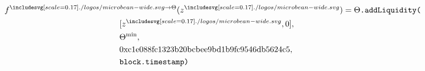 \documentclass[class=article, crop=false]{standalone}
\begin{document}
\begin{enumerate}
        \begin{multline*}
            \begin{aligned}
            & f^{\bean \rightarrow \Theta}(z^{\bean}) = \Theta \code{.addLiquidity(} \\
            & \hspace{4.9cm} [z^{\bean}, 0],\ \\
            & \hspace{4.9cm} \Theta^{\text{min}},\ \\
            & \hspace{4.9cm} \text{0xc1e088fc1323b20bcbee9bd1b9fc9546db5624c5},\ \\
            & \hspace{4.9cm} \code{block.timestamp} \code{)}
            \end{aligned}
        \end{multline*}
        
    \end{enumerate}
    
\end{document}
